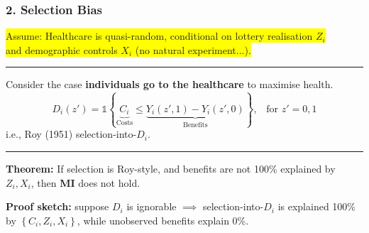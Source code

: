 \documentclass[dvipsnames]{beamer} %
\renewcommand{\vec}[1]{\boldsymbol{\mathit{#1}}}                           %
\newcommand{\indicator}[1]{\mathds{1}\left\{ #1 \right\}}                  %
\begin{document}
\begin{frame}
    \frametitle{2. Selection Bias}
    \colorbox{yellow}{Assume: Healthcare is quasi-random, conditional on lottery realisation $Z_i$} \\
        \colorbox{yellow}{and demographic controls $\vec X_i$ (no natural experiment...).}

    \par\noindent\rule{\textwidth}{0.4pt}
    Consider the case \textbf{individuals go to the healthcare} to maximise health.
    \[ D_i \left( z' \right) = \indicator{
        \underbrace{C_i}_{\text{Costs}} \leq
        \underbrace{Y_i\left( z', 1 \right) - Y_i\left( z', 0 \right)}_{\text{Benefits}}}, \;\;\; \text{for } z'=0,1
    \]
    i.e., Roy (1951) selection-into-$D_i$.
    \par\noindent\rule{\textwidth}{0.4pt}
    \vfill
    \textbf{Theorem:}
    If selection is Roy-style, and benefits are not 100\% explained by $Z_i, \vec X_i$, then \textbf{MI} does not hold.

    \vskip0.125cm
    \textbf{Proof sketch:} suppose $D_i$ is ignorable $\implies$ selection-into-$D_i$ is explained 100\% by $\left\{ C_i, Z_i, \vec X_i \right\}$, while unobserved benefits explain 0\%.
\end{frame}
\end{document}
